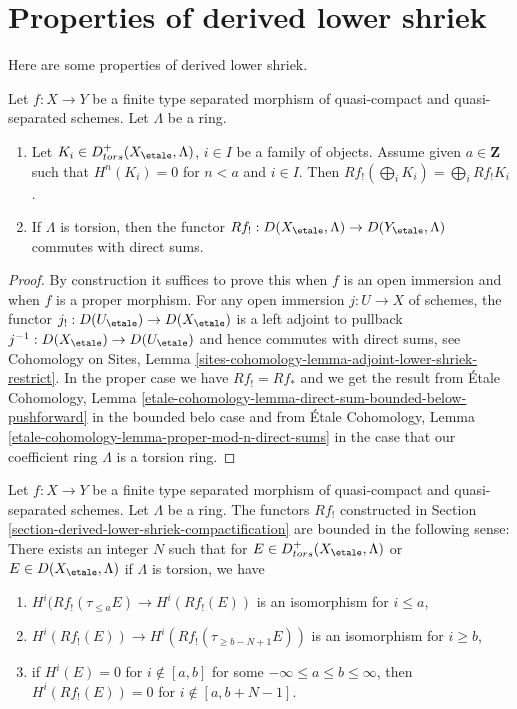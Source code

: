 \section{Properties of derived lower shriek}
\label{section-derived-lower-shriek-properties}

\noindent
Here are some properties of derived lower shriek.

\begin{lemma}
\label{lemma-derived-lower-shriek-commute-direct-sums}
Let $f : X \to Y$ be a finite type separated morphism of quasi-compact
and quasi-separated schemes. Let $\Lambda$ be a ring.
\begin{enumerate}
\item Let $K_i \in D^+_{tors}(X_\etale, \Lambda)$, $i \in I$ be a family
of objects. Assume given $a \in \mathbf{Z}$ such that
$H^n(K_i) = 0$ for $n < a$ and $i \in I$. Then $Rf_!(\bigoplus_i K_i) =
\bigoplus_i Rf_!K_i$.
\item If $\Lambda$ is torsion, then the functor
$Rf_! : D(X_\etale, \Lambda) \to D(Y_\etale, \Lambda)$
commutes with direct sums.
\end{enumerate}
\end{lemma}

\begin{proof}
By construction it suffices to prove this when $f$ is an open immersion
and when $f$ is a proper morphism. For any open immersion $j : U \to X$
of schemes, the functor $j_! : D(U_\etale) \to D(X_\etale)$ is a left
adjoint to pullback $j^{-1} : D(X_\etale) \to D(U_\etale)$
and hence commutes with direct sums, see Cohomology on Sites, Lemma
\ref{sites-cohomology-lemma-adjoint-lower-shriek-restrict}.
In the proper case we have $Rf_! = Rf_*$ and we get the result from
\'Etale Cohomology, Lemma
\ref{etale-cohomology-lemma-direct-sum-bounded-below-pushforward}
in the bounded belo case and from
\'Etale Cohomology, Lemma \ref{etale-cohomology-lemma-proper-mod-n-direct-sums}
in the case that our coefficient ring $\Lambda$ is a torsion ring.
\end{proof}

\begin{lemma}
\label{lemma-derived-lower-shriek-bounded}
Let $f : X \to Y$ be a finite type separated morphism of quasi-compact
and quasi-separated schemes. Let $\Lambda$ be a ring. The functors $Rf_!$
constructed in Section \ref{section-derived-lower-shriek-compactification}
are bounded in the following sense: There exists an integer $N$ such that
for $E \in D^+_{tors}(X_\etale, \Lambda)$ or $E \in D(X_\etale, \Lambda)$
if $\Lambda$ is torsion, we have
\begin{enumerate}
\item $H^i(Rf_!(\tau_{\leq a}E) \to H^i(Rf_!(E))$ is an isomorphism
for $i \leq a$,
\item $H^i(Rf_!(E)) \to H^i(Rf_!(\tau_{\geq b - N + 1}E))$ is an isomorphism
for $i \geq b$,
\item if $H^i(E) = 0$ for $i \not \in [a, b]$ for some
$-\infty \leq a \leq b \leq \infty$, then $H^i(Rf_!(E)) = 0$
for $i \not \in [a, b + N - 1]$.
\end{enumerate}
\end{lemma}

